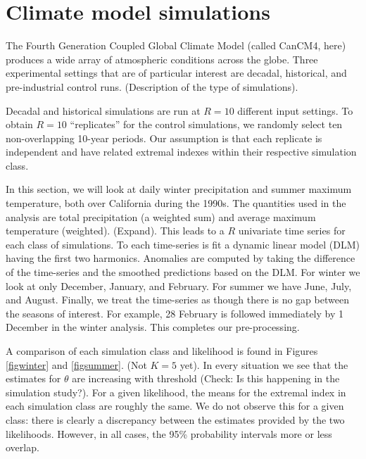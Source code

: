 \section{Climate model simulations}
\label{climate}

The Fourth Generation Coupled Global Climate Model (called CanCM4, here) produces a wide array of atmospheric conditions across the globe. Three experimental settings that are of particular interest are decadal, historical, and pre-industrial control runs. (Description of the type of simulations).

Decadal and historical simulations are run at $R=10$ different input settings. To obtain $R=10$ ``replicates'' for the control simulations, we randomly select ten non-overlapping 10-year periods. Our assumption is that each replicate is independent and have related extremal indexes within their respective simulation class.

In this section, we will look at daily winter precipitation and summer maximum temperature, both over California during the 1990s. The quantities used in the analysis are total precipitation (a weighted sum) and average maximum temperature (weighted). (Expand). This leads to a $R$ univariate time series for each class of simulations. To each time-series is fit a dynamic linear model (DLM) having the first two harmonics. Anomalies are computed by taking the difference of the time-series and the smoothed predictions based on the DLM. For winter we look at only December, January, and February. For summer we have June, July, and August. Finally, we treat the time-series as though there is no gap between the seasons of interest. For example, 28 February is followed immediately by 1 December in the winter analysis. This completes our pre-processing.

A comparison of each simulation class and likelihood is found in Figures \ref{figwinter} and \ref{figsummer}. (Not $K=5$ yet). In every situation we see that the estimates for $\theta$ are increasing with threshold (Check: Is this happening in the simulation study?). For a given likelihood, the means for the extremal index in each simulation class are roughly the same. We do not observe this for a given class: there is clearly a discrepancy between the estimates provided by the two likelihoods. However, in all cases, the 95\% probability intervals more or less overlap.

